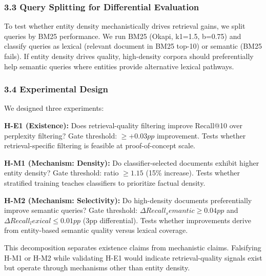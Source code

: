 \subsubsection{3.3 Query Splitting for Differential Evaluation}

To test whether entity density mechanistically drives retrieval gains, we split queries by BM25 performance. We run BM25 (Okapi, k1=1.5, b=0.75) and classify queries as lexical (relevant document in BM25 top-10) or semantic (BM25 fails). If entity density drives quality, high-density corpora should preferentially help semantic queries where entities provide alternative lexical pathways.

\subsubsection{3.4 Experimental Design}

We designed three experiments:

\textbf{H-E1 (Existence):} Does retrieval-quality filtering improve Recall@10 over perplexity filtering? Gate threshold: $\geq +0.03pp$ improvement. Tests whether retrieval-specific filtering is feasible at proof-of-concept scale.

\textbf{H-M1 (Mechanism: Density):} Do classifier-selected documents exhibit higher entity density? Gate threshold: ratio $\geq 1.15$ (15\% increase). Tests whether stratified training teaches classifiers to prioritize factual density.

\textbf{H-M2 (Mechanism: Selectivity):} Do high-density documents preferentially improve semantic queries? Gate threshold: $\Delta Recall_semantic \geq 0.04pp$ and $\Delta Recall_lexical \leq 0.01pp$ (3pp differential). Tests whether improvements derive from entity-based semantic quality versus lexical coverage.

This decomposition separates existence claims from mechanistic claims. Falsifying H-M1 or H-M2 while validating H-E1 would indicate retrieval-quality signals exist but operate through mechanisms other than entity density.
